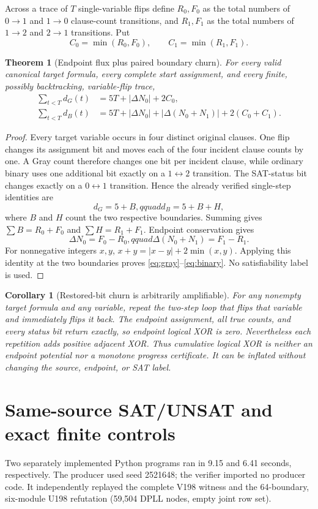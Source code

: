 \documentclass[11pt]{article}
\newtheorem{theorem}{Theorem}
\newtheorem{corollary}{Corollary}
\begin{document}
Across a trace of $T$ single-variable flips define $R_0,F_0$ as the total
numbers of $0\to1$ and $1\to0$ clause-count transitions, and $R_1,F_1$ as the
total numbers of $1\to2$ and $2\to1$ transitions.  Put
\[
C_0=\min(R_0,F_0),\qquad C_1=\min(R_1,F_1).
\]

\begin{theorem}[Endpoint flux plus paired boundary churn]
For every valid canonical target formula, every complete start assignment, and
every finite, possibly backtracking, variable-flip trace,
\begin{align}
\sum_{t<T}d_G(t)
 &=5T+|\Delta N_0|+2C_0,\label{eq:gray}\\
\sum_{t<T}d_B(t)
 &=5T+|\Delta N_0|+|\Delta(N_0+N_1)|+2(C_0+C_1).\label{eq:binary}
\end{align}
\end{theorem}
\begin{proof}
Every target variable occurs in four distinct original clauses.  One flip
changes its assignment bit and moves each of the four incident clause counts by
one.  A Gray count therefore changes one bit per incident clause, while ordinary
binary uses one additional bit exactly on a $1\leftrightarrow2$ transition.  The
SAT-status bit changes exactly on a $0\leftrightarrow1$ transition.  Hence the
already verified single-step identities are
\[
d_G=5+B,qquad d_B=5+B+H,
\]
where $B$ and $H$ count the two respective boundaries.  Summing gives
$\sum B=R_0+F_0$ and $\sum H=R_1+F_1$.  Endpoint conservation gives
\[
\Delta N_0=F_0-R_0,qquad
\Delta(N_0+N_1)=F_1-R_1.
\]
For nonnegative integers $x,y$, $x+y=|x-y|+2\min(x,y)$.
Applying this identity at the two boundaries proves
\eqref{eq:gray}--\eqref{eq:binary}.  No satisfiability label is used.
\end{proof}

\begin{corollary}[Restored-bit churn is arbitrarily amplifiable]
For any nonempty target formula and any variable, repeat the two-step loop that
flips that variable and immediately flips it back.  The endpoint assignment,
all true counts, and every status bit return exactly, so endpoint logical XOR is
zero.  Nevertheless each repetition adds positive adjacent XOR.  Thus
cumulative logical XOR is neither an endpoint potential nor a monotone progress
certificate.  It can be inflated without changing the source, endpoint, or SAT
label.
\end{corollary}

\section{Same-source SAT/UNSAT and exact finite controls}
Two separately implemented Python programs ran in 9.15 and 6.41 seconds,
respectively.  The producer used seed 2521648; the verifier imported no producer
code.  It independently replayed the complete V198 witness and the 64-boundary,
six-module U198 refutation (59,504 DPLL nodes, empty joint row set).
\end{document}
